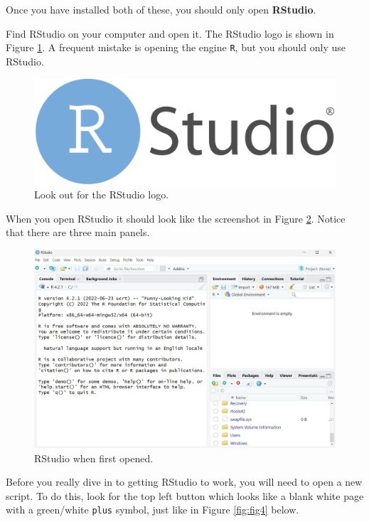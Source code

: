 \documentclass[
]{book}
\begin{document}
Once you have installed both of these, you should only open \textbf{RStudio}.

Find RStudio on your computer and open it. The RStudio logo is shown in Figure \ref{fig:fig2}. A frequent mistake is opening the engine \texttt{R}, but you should only use RStudio.

\begin{figure}

{\centering \includegraphics[width=0.25\linewidth]{images/RStudio} 

}

\caption{Look out for the RStudio logo.}\label{fig:fig2}
\end{figure}

When you open RStudio it should look like the screenshot in Figure \ref{fig:fig3}. Notice that there are three main panels.

\begin{figure}

{\centering \includegraphics[width=1\linewidth]{images/rstudio1} 

}

\caption{RStudio when first opened.}\label{fig:fig3}
\end{figure}

Before you really dive in to getting RStudio to work, you will need to open a new script. To do this, look for the top left button which looks like a blank white page with a green/white \texttt{plus} symbol, just like in Figure \ref{fig:fig4} below.
\end{document}
